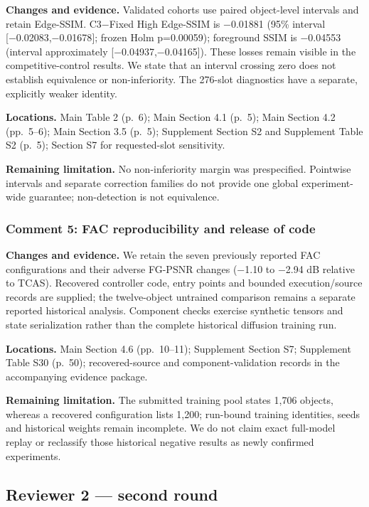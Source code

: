 \documentclass[
  10pt,
]{article}
\begin{document}
\textbf{Changes and evidence.} Validated cohorts use paired object-level
intervals and retain Edge-SSIM. C3−Fixed High Edge-SSIM is −0.01881
(95\% interval {[}−0.02083,−0.01678{]}; frozen Holm p=0.00059);
foreground SSIM is −0.04553 (interval approximately
{[}−0.04937,−0.04165{]}). These losses remain visible in the
competitive-control results. We state that an interval crossing zero
does not establish equivalence or non-inferiority. The 276-slot
diagnostics have a separate, explicitly weaker identity.

\textbf{Locations.} Main Table 2 (p.~6); Main Section 4.1 (p.~5); Main
Section 4.2 (pp.~5--6); Main Section 3.5 (p.~5); Supplement Section S2
and Supplement Table S2 (p.~5); Section S7 for requested-slot
sensitivity.

\textbf{Remaining limitation.} No non-inferiority margin was
prespecified. Pointwise intervals and separate correction families do
not provide one global experiment-wide guarantee; non-detection is not
equivalence.

\hypertarget{comment-5-fac-reproducibility-and-release-of-code}{%
\subsubsection{Comment 5: FAC reproducibility and release of
code}\label{comment-5-fac-reproducibility-and-release-of-code}}

\textbf{Changes and evidence.} We retain the seven previously reported
FAC configurations and their adverse FG-PSNR changes (−1.10 to −2.94 dB
relative to TCAS). Recovered controller code, entry points and bounded
execution/source records are supplied; the twelve-object untrained
comparison remains a separate reported historical analysis. Component
checks exercise synthetic tensors and state serialization rather than
the complete historical diffusion training run.

\textbf{Locations.} Main Section 4.6 (pp.~10--11); Supplement Section
S7; Supplement Table S30 (p.~50); recovered-source and
component-validation records in the accompanying evidence package.

\textbf{Remaining limitation.} The submitted training pool states 1,706
objects, whereas a recovered configuration lists 1,200; run-bound
training identities, seeds and historical weights remain incomplete. We
do not claim exact full-model replay or reclassify those historical
negative results as newly confirmed experiments.

\hypertarget{reviewer-2-second-round}{%
\subsection{Reviewer 2 --- second round}\label{reviewer-2-second-round}}
\end{document}
